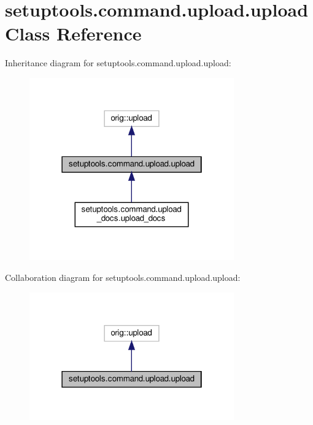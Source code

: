 \hypertarget{classsetuptools_1_1command_1_1upload_1_1upload}{}\section{setuptools.\+command.\+upload.\+upload Class Reference}
\label{classsetuptools_1_1command_1_1upload_1_1upload}


Inheritance diagram for setuptools.\+command.\+upload.\+upload\+:
\nopagebreak
\begin{figure}[H]
\begin{center}
\leavevmode
\includegraphics[width=250pt]{classsetuptools_1_1command_1_1upload_1_1upload__inherit__graph}
\end{center}
\end{figure}


Collaboration diagram for setuptools.\+command.\+upload.\+upload\+:
\nopagebreak
\begin{figure}[H]
\begin{center}
\leavevmode
\includegraphics[width=250pt]{classsetuptools_1_1command_1_1upload_1_1upload__coll__graph}
\end{center}
\end{figure}
